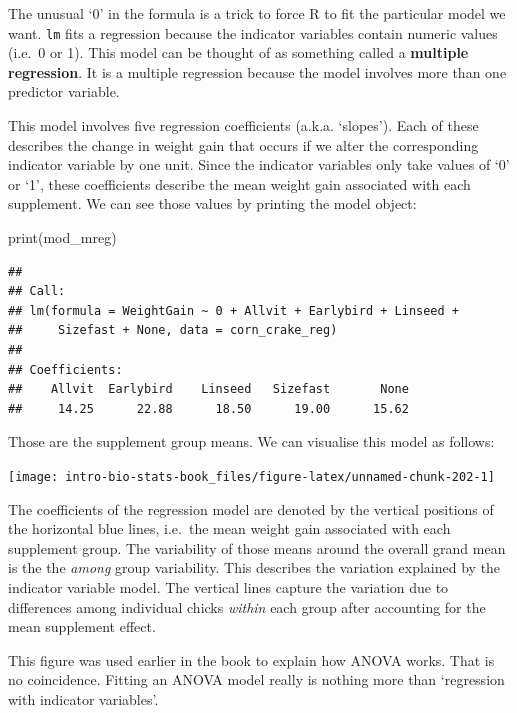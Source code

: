 \documentclass[
]{book}
\newenvironment{Shaded}{\begin{snugshade}}{\end{snugshade}}
\newcommand{\FunctionTok}[1]{\textcolor[rgb]{0.00,0.00,0.00}{#1}}
\newcommand{\NormalTok}[1]{#1}
\begin{document}
The unusual `0' in the formula is a trick to force R to fit the particular model we want. \texttt{lm} fits a regression because the indicator variables contain numeric values (i.e.~0 or 1). This model can be thought of as something called a \textbf{multiple regression}. It is a multiple regression because the model involves more than one predictor variable.

This model involves five regression coefficients (a.k.a. `slopes'). Each of these describes the change in weight gain that occurs if we alter the corresponding indicator variable by one unit. Since the indicator variables only take values of `0' or `1', these coefficients describe the mean weight gain associated with each supplement. We can see those values by printing the model object:

\begin{Shaded}
\begin{Highlighting}[]
\FunctionTok{print}\NormalTok{(mod\_mreg)}
\end{Highlighting}
\end{Shaded}

\begin{verbatim}
## 
## Call:
## lm(formula = WeightGain ~ 0 + Allvit + Earlybird + Linseed + 
##     Sizefast + None, data = corn_crake_reg)
## 
## Coefficients:
##    Allvit  Earlybird    Linseed   Sizefast       None  
##     14.25      22.88      18.50      19.00      15.62
\end{verbatim}

Those are the supplement group means. We can visualise this model as follows:

\begin{center}\texttt{[image: intro-bio-stats-book\_files/figure-latex/unnamed-chunk-202-1]} \end{center}

The coefficients of the regression model are denoted by the vertical positions of the horizontal blue lines, i.e.~the mean weight gain associated with each supplement group. The variability of those means around the overall grand mean is the the \emph{among} group variability. This describes the variation explained by the indicator variable model. The vertical lines capture the variation due to differences among individual chicks \emph{within} each group after accounting for the mean supplement effect.

This figure was used earlier in the book to explain how ANOVA works. That is no coincidence. Fitting an ANOVA model really is nothing more than `regression with indicator variables'.
\end{document}
